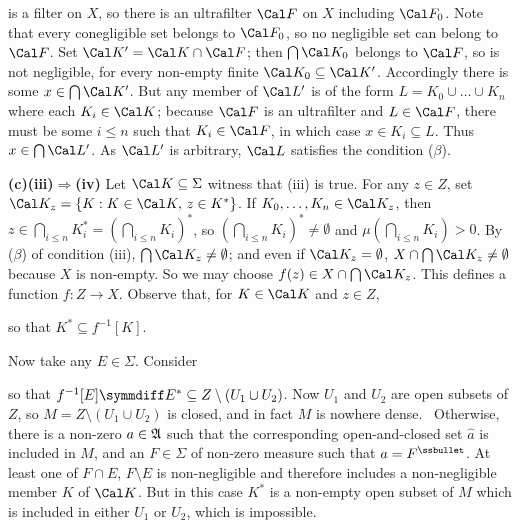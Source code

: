 {\noindent is a filter on $X$, so there is an ultrafilter $\Cal F$ on $X$
including $\Cal F_0$.   Note that every conegligible set belongs to
$\Cal F_0$, so no negligible set can belong to $\Cal F$.   Set $\Cal
K'=\Cal K\cap\Cal F$;  then $\bigcap\Cal K_0$ belongs to $\Cal F$, so is
not negligible, for every non-empty finite $\Cal K_0\subseteq\Cal K'$.
Accordingly there is some $x\in\bigcap\Cal K'$.   But any member of
$\Cal L'$ is of the form $L=K_0\cup\ldots\cup K_n$ where each
$K_i\in\Cal K$;
because $\Cal F$ is an ultrafilter and $L\in\Cal F$, there must be some
$i\le n$ such that $K_i\in\Cal F$, in which case $x\in K_i\subseteq L$.
Thus $x\in\bigcap\Cal L'$.   As $\Cal L'$ is arbitrary, $\Cal L$
satisfies the condition ($\beta$).\ \Qed

\medskip

{\bf (c)(iii)$\Rightarrow$(iv)}
Let $\Cal K\subseteq\Sigma$ witness that (iii) is true.   For any $z\in
Z$, set $\Cal
K_z=\{K:K\in\Cal K,\,z\in K^*\}$.    If $K_0,\ldots,K_n\in\Cal K_z$,
then $z\in\bigcap_{i\le n}K^*_i=(\bigcap_{i\le n}K_i)^*$, so
$(\bigcap_{i\le n}K_i)^*\ne\emptyset$ and $\mu(\bigcap_{i\le n}K_i)>0$.
By ($\beta$) of condition (iii), $\bigcap\Cal
K_z\ne\emptyset$;  and even if $\Cal K_z=\emptyset$, $X\cap\bigcap\Cal
K_z\ne\emptyset$ because $X$ is non-empty.   So we may choose $f(z)\in
X\cap\bigcap\Cal K_z$.   This defines a function $f:Z\to X$.   Observe
that, for $K\in\Cal K$ and $z\in Z$,


\noindent so that $K^*\subseteq f^{-1}[K]$.

Now take any $E\in\Sigma$.   Consider



\noindent so that $f^{-1}[E]\symmdiff E^*\subseteq Z\setminus(U_1\cup
U_2)$.   Now $U_1$ and $U_2$ are open subsets of $Z$, so
$M=Z\setminus(U_1\cup U_2)$ is closed, and in fact $M$ is nowhere dense.
\Prf\Quer\ Otherwise, there is a non-zero $a\in\frak A$ such that the
corresponding open-and-closed set
$\widehat{a}$ is included in $M$, and an $F\in\Sigma$ of non-zero
measure such that
$a=F^{\ssbullet}$.   At least one of $F\cap E$, $F\setminus E$ is
non-negligible and therefore includes a non-negligible member $K$ of
$\Cal K$.   But in this case $K^*$ is a non-empty open subset of $M$
which is included in either $U_1$ or $U_2$, which is
impossible.\ \Bang\Qed

}
